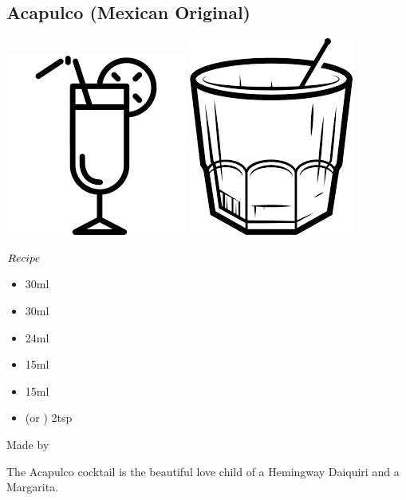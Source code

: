 \subsection{Acapulco (Mexican Original)}
\vspace{-7.5mm}
\hspace{71mm}
\includegraphics[scale=.07]{cocktail_glass_tall.png}
\includegraphics[scale=.06]{cocktail_glass_rock.png}
\vspace{2.5mm}
\begin{itembox}[l]{\boldmath $Recipe$}
\begin{itemize}
\setlength{\parskip}{0cm}
\setlength{\itemsep}{0cm}
\item \teq 30ml
\item \rum 30ml
\item \pj 24ml
\item \gj 15ml
\item \limj 15ml
\item \sugar (or \gumsyrup) 2tsp
\end{itemize}
\vspace{-4mm}
Made by \shake
\end{itembox}
The Acapulco cocktail is the beautiful love child of a Hemingway Daiquiri and a Margarita.
